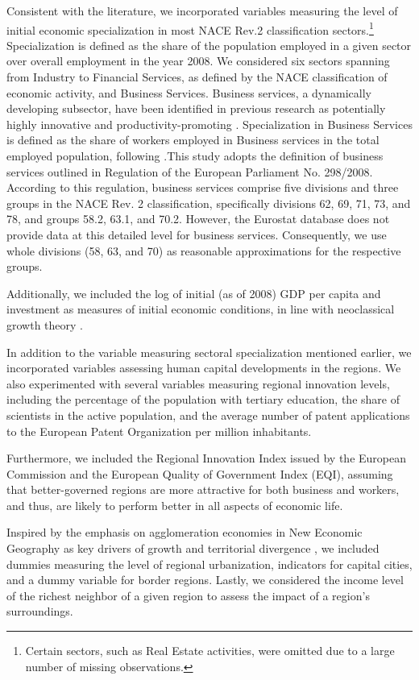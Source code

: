 \documentclass[11pt]{article}
\begin{document}
Consistent with the literature, we incorporated variables measuring the level of initial economic specialization in most NACE Rev.2 classification sectors.\footnote{Certain sectors, such as Real Estate activities, were omitted due to a large number of missing observations.} Specialization is defined as the share of the population employed in a given sector over overall employment in the year 2008. We considered six sectors spanning from Industry to Financial Services, as defined by the NACE classification of economic activity, and Business Services. Business services, a dynamically developing subsector, have been identified in previous research as potentially highly innovative and productivity-promoting \citep{corrocher2014kibs}. Specialization in Business Services is defined as the share of workers employed in Business services in the total employed population, following \citet{guastella2015knowledge}.This study adopts the definition of business services outlined in Regulation of the European Parliament No. 298/2008. According to this regulation, business services comprise five divisions and three groups in the NACE Rev. 2 classification, specifically divisions 62, 69, 71, 73, and 78, and groups 58.2, 63.1, and 70.2. However, the Eurostat database does not provide data at this detailed level for business services. Consequently, we use whole divisions (58, 63, and 70) as reasonable approximations for the respective groups.

Additionally, we included the log of initial (as of 2008) GDP per capita and investment as measures of initial economic conditions, in line with neoclassical growth theory \cite{iammarino2017regional}.

In addition to the variable measuring sectoral specialization mentioned earlier, we incorporated variables assessing human capital developments in the regions. We also experimented with several variables measuring regional innovation levels, including the percentage of the population with tertiary education, the share of scientists in the active population, and the average number of patent applications to the European Patent Organization per million inhabitants.

Furthermore, we included the Regional Innovation Index issued by the European Commission and the European Quality of Government Index (EQI), assuming that better-governed regions are more attractive for both business and workers, and thus, are likely to perform better in all aspects of economic life.

Inspired by the emphasis on agglomeration economies in New Economic Geography as key drivers of growth and territorial divergence \citep{iammarino2017regional}, we included dummies measuring the level of regional urbanization, indicators for capital cities, and a dummy variable for border regions.
Lastly, we considered the income level of the richest neighbor of a given region to assess the impact of a region's surroundings.
\end{document}
